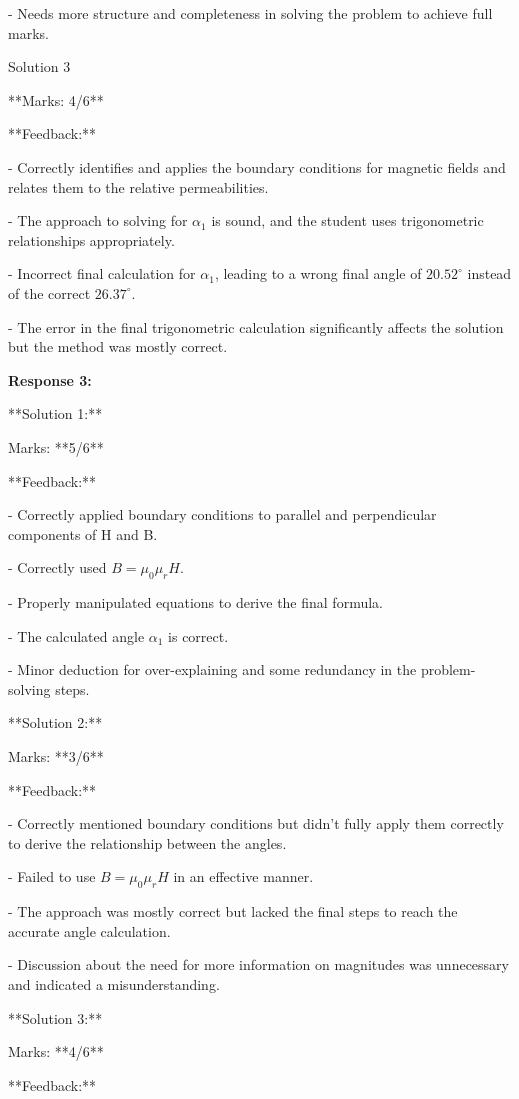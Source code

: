 \documentclass[a4paper,11pt]{article}
\begin{document}
- Needs more structure and completeness in solving the problem to achieve full marks.

Solution 3

**Marks: 4/6**

**Feedback:**

- Correctly identifies and applies the boundary conditions for magnetic fields and relates them to the relative permeabilities.

- The approach to solving for \(\alpha_1\) is sound, and the student uses trigonometric relationships appropriately.

- Incorrect final calculation for \(\alpha_1\), leading to a wrong final angle of \(20.52^\circ\) instead of the correct \(26.37^\circ\).

- The error in the final trigonometric calculation significantly affects the solution but the method was mostly correct.

\bigskip
\textbf{Response 3:}

**Solution 1:**

Marks: **5/6**

**Feedback:**

- Correctly applied boundary conditions to parallel and perpendicular components of H and B.

- Correctly used \( B = \mu_0 \mu_r H \).

- Properly manipulated equations to derive the final formula.

- The calculated angle \(\alpha_1\) is correct.

- Minor deduction for over-explaining and some redundancy in the problem-solving steps.

**Solution 2:**

Marks: **3/6**

**Feedback:**

- Correctly mentioned boundary conditions but didn't fully apply them correctly to derive the relationship between the angles.

- Failed to use \( B = \mu_0 \mu_r H \) in an effective manner.

- The approach was mostly correct but lacked the final steps to reach the accurate angle calculation.

- Discussion about the need for more information on magnitudes was unnecessary and indicated a misunderstanding.

**Solution 3:**

Marks: **4/6**

**Feedback:**
\end{document}
